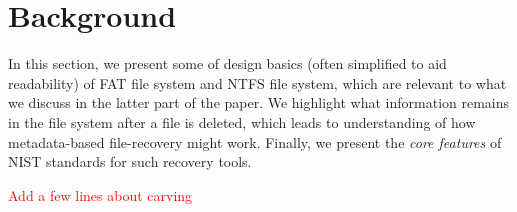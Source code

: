 \documentclass{ws-rv9x6}
\newcommand{\TODO}[1]{\textcolor{red}{#1}} %
\newenvironment{paraphrase}{\color{blue}}{\color{black}} %
\begin{document}
\section{Background}

\begin{paraphrase}
 In this section, we present some of design basics (often simplified to aid readability) of FAT file system and NTFS file system, 
which are relevant to what we discuss in the latter part of the paper. 
We highlight what information remains in the file system after a file is deleted, 
which leads to understanding of how metadata-based file-recovery might work. 
Finally, we present the \emph{core features} of NIST standards for such recovery tools.  
\end{paraphrase}

\TODO{Add a few lines about carving}
\end{document}
